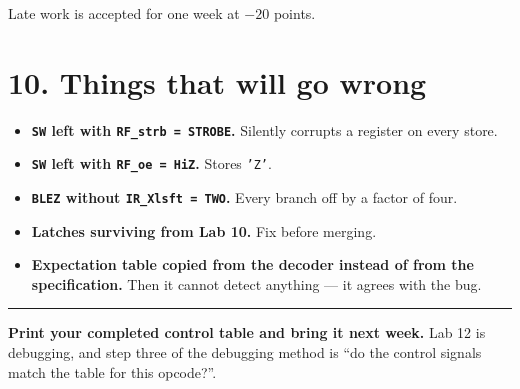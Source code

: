 \documentclass[11pt]{article}
\newcommand{\code}[1]{\texttt{#1}}
\newcommand{\hr}{\vspace{2pt}\hrule\vspace{6pt}}
\begin{document}
Late work is accepted for one week at $-20$ points.

\section*{10. Things that will go wrong}

\begin{itemize}[leftmargin=1.6em,itemsep=1pt]
\item \textbf{\code{SW} left with \code{RF\_strb = STROBE}.} Silently corrupts a
register on every store.
\item \textbf{\code{SW} left with \code{RF\_oe = HiZ}.} Stores \code{'Z'}.
\item \textbf{\code{BLEZ} without \code{IR\_Xlsft = TWO}.} Every branch off by a
factor of four.
\item \textbf{Latches surviving from Lab 10.} Fix before merging.
\item \textbf{Expectation table copied from the decoder instead of from the
specification.} Then it cannot detect anything --- it agrees with the bug.
\end{itemize}

\vspace{10pt}
\hr
{\small \textbf{Print your completed control table and bring it next week.} Lab
12 is debugging, and step three of the debugging method is ``do the control
signals match the table for this opcode?''.}
\end{document}

